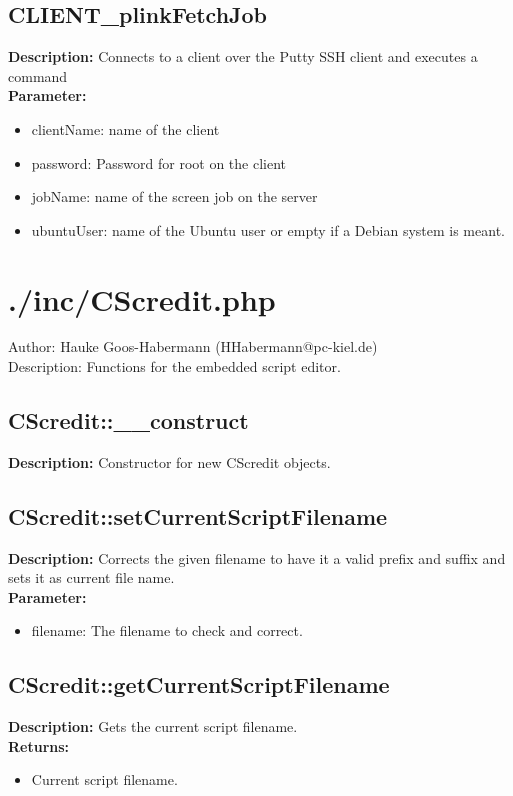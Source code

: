 \subsection{CLIENT\_plinkFetchJob}
\textbf{Description:} Connects to a client over the Putty SSH client and executes a command\\
\textbf{Parameter:}
\begin{itemize}
\item clientName: name of the client
\item password: Password for root on the client
\item jobName: name of the screen job on the server
\item ubuntuUser: name of the Ubuntu user or empty if a Debian system is meant.
\end{itemize}

\newpage\section{./inc/CScredit.php}
 Author: Hauke Goos-Habermann (HHabermann@pc-kiel.de)\\
 Description: Functions for the embedded script editor.\\

\subsection{CScredit::\_\_construct}
\textbf{Description:} Constructor for new CScredit objects.\\

\subsection{CScredit::setCurrentScriptFilename}
\textbf{Description:} Corrects the given filename to have it a valid prefix and suffix and sets it as current file name.\\
\textbf{Parameter:}
\begin{itemize}
\item filename: The filename to check and correct.
\end{itemize}

\subsection{CScredit::getCurrentScriptFilename}
\textbf{Description:} Gets the current script filename.\\
\textbf{Returns:}
\begin{itemize}
\item Current script filename.
\end{itemize}

